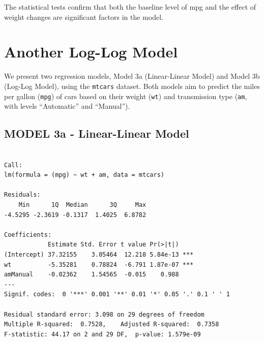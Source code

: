 \documentclass[
  letterpaper,
  DIV=11,
  numbers=noendperiod]{scrreport}
\newenvironment{Shaded}{\begin{snugshade}}{\end{snugshade}}
\newcommand{\AttributeTok}[1]{\textcolor[rgb]{0.40,0.45,0.13}{#1}}
\newcommand{\CommentTok}[1]{\textcolor[rgb]{0.37,0.37,0.37}{#1}}
\newcommand{\FunctionTok}[1]{\textcolor[rgb]{0.28,0.35,0.67}{#1}}
\newcommand{\NormalTok}[1]{\textcolor[rgb]{0.00,0.23,0.31}{#1}}
\newcommand{\OtherTok}[1]{\textcolor[rgb]{0.00,0.23,0.31}{#1}}
\newcommand{\SpecialCharTok}[1]{\textcolor[rgb]{0.37,0.37,0.37}{#1}}
\newcommand{\StringTok}[1]{\textcolor[rgb]{0.13,0.47,0.30}{#1}}
\begin{document}
The statistical tests confirm that both the baseline level of mpg and
the effect of weight changes are significant factors in the model.

\section{Another Log-Log Model}\label{another-log-log-model}

We present two regression models, Model 3a (Linear-Linear Model) and
Model 3b (Log-Log Model), using the \texttt{mtcars} dataset. Both models
aim to predict the miles per gallon (\texttt{mpg}) of cars based on
their weight (\texttt{wt}) and transmission type (\texttt{am}, with
levels ``Automatic'' and ``Manual'').

\subsection{MODEL 3a - Linear-Linear
Model}\label{model-3a---linear-linear-model}

\begin{Shaded}
\end{Shaded}

\begin{verbatim}

Call:
lm(formula = (mpg) ~ wt + am, data = mtcars)

Residuals:
    Min      1Q  Median      3Q     Max 
-4.5295 -2.3619 -0.1317  1.4025  6.8782 

Coefficients:
            Estimate Std. Error t value Pr(>|t|)    
(Intercept) 37.32155    3.05464  12.218 5.84e-13 ***
wt          -5.35281    0.78824  -6.791 1.87e-07 ***
amManual    -0.02362    1.54565  -0.015    0.988    
---
Signif. codes:  0 '***' 0.001 '**' 0.01 '*' 0.05 '.' 0.1 ' ' 1

Residual standard error: 3.098 on 29 degrees of freedom
Multiple R-squared:  0.7528,    Adjusted R-squared:  0.7358 
F-statistic: 44.17 on 2 and 29 DF,  p-value: 1.579e-09
\end{verbatim}
\end{document}
